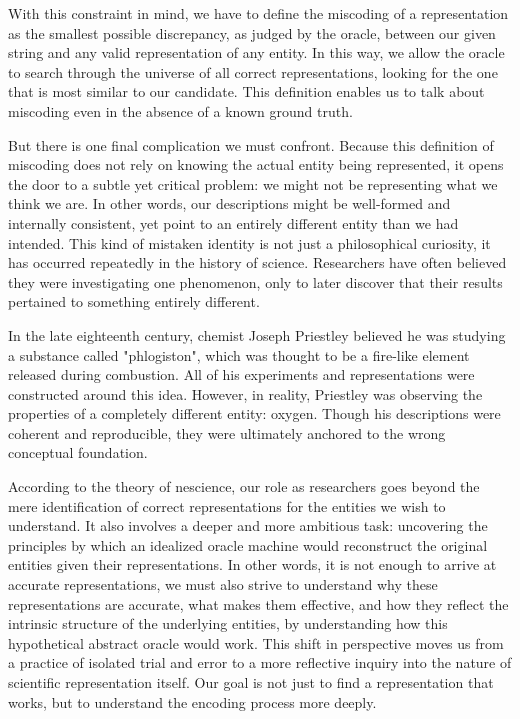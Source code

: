 With this constraint in mind, we have to define the miscoding of a representation as the smallest possible discrepancy, as judged by the oracle, between our given string and any valid representation of any entity. In this way, we allow the oracle to search through the universe of all correct representations, looking for the one that is most similar to our candidate. This definition enables us to talk about miscoding even in the absence of a known ground truth. 

But there is one final complication we must confront. Because this definition of miscoding does not rely on knowing the actual entity being represented, it opens the door to a subtle yet critical problem: we might not be representing what we think we are. In other words, our descriptions might be well-formed and internally consistent, yet point to an entirely different entity than we had intended. This kind of mistaken identity is not just a philosophical curiosity, it has occurred repeatedly in the history of science. Researchers have often believed they were investigating one phenomenon, only to later discover that their results pertained to something entirely different.

\begin{example}
In the late eighteenth century, chemist Joseph Priestley believed he was studying a substance called "phlogiston", which was thought to be a fire-like element released during combustion. All of his experiments and representations were constructed around this idea. However, in reality, Priestley was observing the properties of a completely different entity: oxygen. Though his descriptions were coherent and reproducible, they were ultimately anchored to the wrong conceptual foundation.
\end{example}

According to the theory of nescience, our role as researchers goes beyond the mere identification of correct representations for the entities we wish to understand. It also involves a deeper and more ambitious task: uncovering the principles by which an idealized oracle machine would reconstruct the original entities given their representations. In other words, it is not enough to arrive at accurate representations, we must also strive to understand why these representations are accurate, what makes them effective, and how they reflect the intrinsic structure of the underlying entities, by understanding how this hypothetical abstract oracle would work. This shift in perspective moves us from a practice of isolated trial and error to a more reflective inquiry into the nature of scientific representation itself. Our goal is not just to find a representation that works, but to understand the encoding process more deeply.

